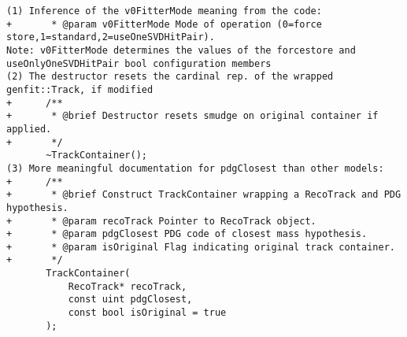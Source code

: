 \begin{verbatim}
(1) Inference of the v0FitterMode meaning from the code:
+       * @param v0FitterMode Mode of operation (0=force store,1=standard,2=useOneSVDHitPair).
Note: v0FitterMode determines the values of the forcestore and useOnlyOneSVDHitPair bool configuration members
(2) The destructor resets the cardinal rep. of the wrapped genfit::Track, if modified
+      /**
+       * @brief Destructor resets smudge on original container if applied.
+       */
       ~TrackContainer();
(3) More meaningful documentation for pdgClosest than other models:
+      /**
+       * @brief Construct TrackContainer wrapping a RecoTrack and PDG hypothesis.
+       * @param recoTrack Pointer to RecoTrack object.
+       * @param pdgClosest PDG code of closest mass hypothesis.
+       * @param isOriginal Flag indicating original track container.
+       */
       TrackContainer(
           RecoTrack* recoTrack,
           const uint pdgClosest,
           const bool isOriginal = true
       );
\end{verbatim}